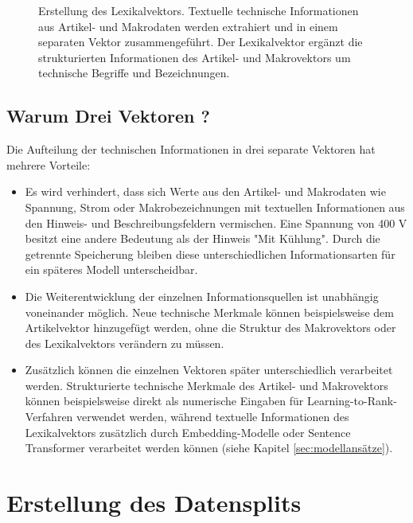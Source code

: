 \begin{figure}[H]
        \caption{Erstellung des Lexikalvektors. Textuelle technische Informationen aus Artikel- und Makrodaten werden extrahiert und in einem separaten Vektor zusammengeführt. 
        Der Lexikalvektor ergänzt die strukturierten Informationen des Artikel- und Makrovektors um technische Begriffe und Bezeichnungen.} 
        \label{fig:lexikalvektor} 
        \end{figure}

\subsection{Warum Drei Vektoren ?}

Die Aufteilung der technischen Informationen in drei separate Vektoren hat mehrere Vorteile:

\begin{itemize}
    \item Es wird verhindert, dass sich Werte aus den Artikel- und Makrodaten wie Spannung, Strom oder Makrobezeichnungen mit textuellen Informationen aus den Hinweis- und Beschreibungsfeldern vermischen. Eine Spannung von 400 V besitzt eine andere Bedeutung als der Hinweis "Mit Kühlung". Durch die getrennte Speicherung bleiben diese unterschiedlichen Informationsarten für ein späteres Modell unterscheidbar.
    \item Die Weiterentwicklung der einzelnen Informationsquellen ist unabhängig voneinander möglich. Neue technische Merkmale können beispielsweise dem Artikelvektor hinzugefügt werden, ohne die Struktur des Makrovektors oder des Lexikalvektors verändern zu müssen. 
    \item Zusätzlich können die einzelnen Vektoren später unterschiedlich verarbeitet werden. Strukturierte technische Merkmale des Artikel- und Makrovektors können beispielsweise direkt als numerische Eingaben für Learning-to-Rank-Verfahren verwendet werden, während textuelle Informationen des Lexikalvektors zusätzlich durch Embedding-Modelle oder Sentence Transformer verarbeitet werden können (siehe Kapitel \ref{sec:modellansätze}).
\end{itemize}
 

\section{Erstellung des Datensplits} 
